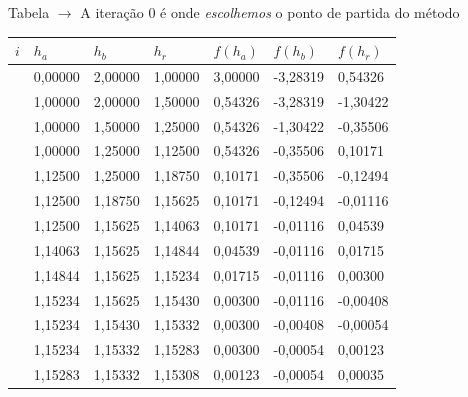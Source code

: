\begin{frame}{Tabela}
    \(\rightarrow\) A iteração 0 é onde \textit{escolhemos} o ponto de partida do método

    \centering
    \begin{tabular}{c|P{1.75cm}|P{1.75cm}|P{1.75cm}|P{1.75cm}|P{1.75cm}|P{1.75cm}}
        \(i\) & \(h_a\) & \(h_b\) & \(h_r\) & \(f(h_a)\) & \(f(h_b)\) & \(f(h_r)\) \\ \hline{} & 0,00000 & 2,00000 & 1,00000 & 3,00000 & -3,28319 & 0,54326 \\ \hline{} & 1,00000 & 2,00000 & 1,50000 & 0,54326 & -3,28319 & -1,30422 \\ \hline{} & 1,00000 & 1,50000 & 1,25000 & 0,54326 & -1,30422 & -0,35506 \\ \hline{} & 1,00000 & 1,25000 & 1,12500 & 0,54326 & -0,35506 & 0,10171 \\ \hline{} & 1,12500 & 1,25000 & 1,18750 & 0,10171 & -0,35506 & -0,12494 \\ \hline{} & 1,12500 & 1,18750 & 1,15625 & 0,10171 & -0,12494 & -0,01116 \\ \hline{} & 1,12500 & 1,15625 & 1,14063 & 0,10171 & -0,01116 & 0,04539 \\ \hline{} & 1,14063 & 1,15625 & 1,14844 & 0,04539 & -0,01116 & 0,01715 \\ \hline{} & 1,14844 & 1,15625 & 1,15234 & 0,01715 & -0,01116 & 0,00300 \\ \hline{} & 1,15234 & 1,15625 & 1,15430 & 0,00300 & -0,01116 & -0,00408 \\ \hline{} & 1,15234 & 1,15430 & 1,15332 & 0,00300 & -0,00408 & -0,00054 \\ \hline{} & 1,15234 & 1,15332 & 1,15283 & 0,00300 & -0,00054 & 0,00123 \\ \hline{} & 1,15283 & 1,15332 & 1,15308 & 0,00123 & -0,00054 & 0,00035
    \end{tabular}
\end{frame}

